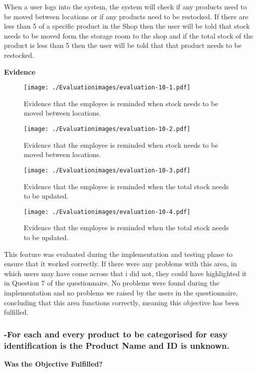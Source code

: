 When a user logs into the system, the system will check if any products need to be moved between locations or if any products need to be restocked. If there are less than 5 of a specific product in the Shop then the user will be told that stock needs to be moved form the storage room to the shop and if the total stock of the product is less than 5 then the user will be told that that product needs to be restocked.\newline

\textbf{Evidence} \newline

\begin{figure}[H]
\caption{Evidence that the employee is reminded when stock needs to be moved between locations.} \label{fig:evaluation-10-1}
\hfill\texttt{[image: ./Evaluationimages/evaluation-10-1.pdf]}
\end{figure}

\begin{figure}[H]
\caption{Evidence that the employee is reminded when stock needs to be moved between locations.} \label{fig:evaluation-10-2}
\hfill\texttt{[image: ./Evaluationimages/evaluation-10-2.pdf]}
\end{figure}

\begin{figure}[H]
\caption{Evidence that the employee is reminded when the total stock needs to be updated.} \label{fig:evaluation-10-3}
\hfill\texttt{[image: ./Evaluationimages/evaluation-10-3.pdf]}
\end{figure}

\begin{figure}[H]
\caption{Evidence that the employee is reminded when the total stock needs to be updated.} \label{fig:evaluation-10-4}
\hfill\texttt{[image: ./Evaluationimages/evaluation-10-4.pdf]}
\end{figure}

This feature was evaluated during the implementation and testing phase to ensure that it worked correctly. If there were any problems with this area, in which users may have come across that i did not, they could have highlighted it in Question 7 of the questionnaire. No problems were found during the implementation and no problems we raised by the users in the questionnaire, concluding that this area functions correctly, meaning this objective has been fulfilled.


\pagebreak
\subsubsection{-For each and every product to be categorised for easy identification is the Product Name and ID is unknown.}
\textbf{Was the Objective Fulfilled?} \newline

